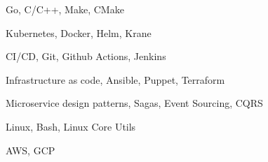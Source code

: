 \item Go, C/C++, Make, CMake
\item Kubernetes, Docker, Helm, Krane
\item CI/CD, Git, Github Actions, Jenkins
\item Infrastructure as code, Ansible, Puppet, Terraform
\item Microservice design patterns, Sagas, Event Sourcing, CQRS
\item Linux, Bash, Linux Core Utils
\item AWS, GCP
